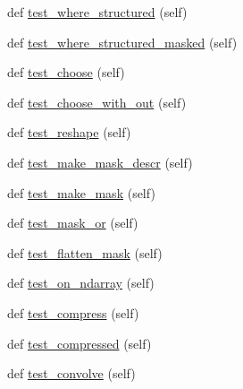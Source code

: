 \begin{DoxyCompactItemize}
\item 
def \hyperlink{classnumpy_1_1ma_1_1tests_1_1test__core_1_1TestMaskedArrayFunctions_a005bc692f820aa2f32fd6cb2cf24bbd4}{test\+\_\+where\+\_\+structured} (self)
\item 
def \hyperlink{classnumpy_1_1ma_1_1tests_1_1test__core_1_1TestMaskedArrayFunctions_a4ab8a03a358f141c8af2a9bc7104f1ad}{test\+\_\+where\+\_\+structured\+\_\+masked} (self)
\item 
def \hyperlink{classnumpy_1_1ma_1_1tests_1_1test__core_1_1TestMaskedArrayFunctions_a32c142065449a5523f2288048558a948}{test\+\_\+choose} (self)
\item 
def \hyperlink{classnumpy_1_1ma_1_1tests_1_1test__core_1_1TestMaskedArrayFunctions_aabbe33fa7e63bb9bce9953c8ce037275}{test\+\_\+choose\+\_\+with\+\_\+out} (self)
\item 
def \hyperlink{classnumpy_1_1ma_1_1tests_1_1test__core_1_1TestMaskedArrayFunctions_acbc93e86dc54b86a823a1f55abd07beb}{test\+\_\+reshape} (self)
\item 
def \hyperlink{classnumpy_1_1ma_1_1tests_1_1test__core_1_1TestMaskedArrayFunctions_ad5ac71994ab5d03e645c7d1f37170597}{test\+\_\+make\+\_\+mask\+\_\+descr} (self)
\item 
def \hyperlink{classnumpy_1_1ma_1_1tests_1_1test__core_1_1TestMaskedArrayFunctions_aedd5f446239b3d76864f51b7759f11d8}{test\+\_\+make\+\_\+mask} (self)
\item 
def \hyperlink{classnumpy_1_1ma_1_1tests_1_1test__core_1_1TestMaskedArrayFunctions_ada80c0e1b310cb094532ee2410407ba5}{test\+\_\+mask\+\_\+or} (self)
\item 
def \hyperlink{classnumpy_1_1ma_1_1tests_1_1test__core_1_1TestMaskedArrayFunctions_ad2a55fc6ce34ff3d6d3329ada63dd83c}{test\+\_\+flatten\+\_\+mask} (self)
\item 
def \hyperlink{classnumpy_1_1ma_1_1tests_1_1test__core_1_1TestMaskedArrayFunctions_a8e7d1b5bfbee83993b10fed965e112ed}{test\+\_\+on\+\_\+ndarray} (self)
\item 
def \hyperlink{classnumpy_1_1ma_1_1tests_1_1test__core_1_1TestMaskedArrayFunctions_aaae903e41fb6701004d2e8cc1b7def79}{test\+\_\+compress} (self)
\item 
def \hyperlink{classnumpy_1_1ma_1_1tests_1_1test__core_1_1TestMaskedArrayFunctions_a30acbfc66c0c39033ad8be56565f1c55}{test\+\_\+compressed} (self)
\item 
def \hyperlink{classnumpy_1_1ma_1_1tests_1_1test__core_1_1TestMaskedArrayFunctions_a0f05b1217bb37420ea8f2fd52523dc59}{test\+\_\+convolve} (self)
\end{DoxyCompactItemize}
